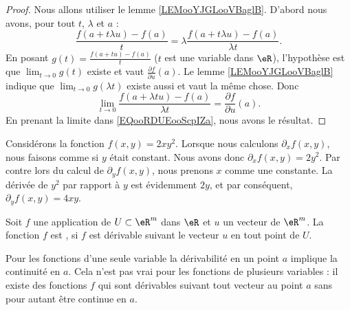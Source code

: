 \begin{proof}
    Nous allons utiliser le lemme \ref{LEMooYJGLooVBaglB}. D'abord nous avons, pour tout \( t\), \( \lambda\) et \( a\)  :
    \begin{equation}        \label{EQooRDUEooScpIZa}
        \frac{ f(a+t\lambda u)-f(a) }{ t }=\lambda\frac{ f(a+t\lambda u)-f(a) }{ \lambda t }.
    \end{equation}
    En posant \( g(t)=\frac{ f(a+tu)-f(a) }{ t }\) (\( t\) est une variable dans \( \eR\)), l'hypothèse est que \( \lim_{t\to 0} g(t)\) existe et vaut \( \frac{ \partial f }{ \partial u }(a)\). Le lemme \ref{LEMooYJGLooVBaglB} indique que \( \lim_{t\to 0} g(\lambda t)\) existe aussi et vaut la même chose. Donc
    \begin{equation}
        \lim_{t\to 0} \frac{ f(a+\lambda tu)-f(a) }{ \lambda t }=\frac{ \partial f }{ \partial u }(a).
    \end{equation}
    En prenant la limite dans \eqref{EQooRDUEooScpIZa}, nous avons le résultat.
\end{proof}

\begin{example}
	Considérons la fonction $f(x,y)=2xy^2$. Lorsque nous calculons $\partial_xf(x,y)$, nous faisons comme si $y$ était constant. Nous avons donc $\partial_xf(x,y)=2y^2$. Par contre lors du calcul de $\partial_yf(x,y)$, nous prenons $x$ comme une constante. La dérivée de $y^2$ par rapport à $y$ est évidemment $2y$, et par conséquent, $\partial_yf(x,y)=4xy$.
\end{example}

\begin{definition}
  Soit $f$ une application de $U\subset\eR^m$ dans $\eR$ et $u$ un vecteur de $\eR^m$. La fonction $f$ est , si $f$ est dérivable  suivant le vecteur $u$ en tout point de $U$.
\end{definition}

Pour les fonctions d'une seule variable la dérivabilité en un point $a$ implique la continuité en $a$. Cela n'est pas vrai pour les fonctions de plusieurs variables : il existe des fonctions $f$  qui sont dérivables suivant tout vecteur au point $a$ sans pour autant être continue en $a$.

